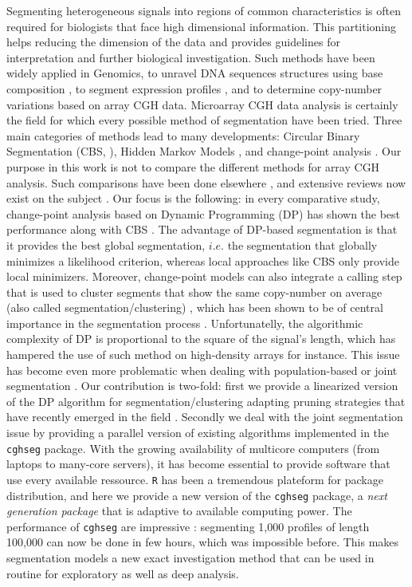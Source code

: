 \documentclass[11pt]{llncs}
\begin{document}
Segmenting heterogeneous signals into regions of common characteristics is often required for biologists that face high dimensional information. This partitioning helps reducing the dimension of the data and provides guidelines for interpretation and further biological investigation. Such methods have been widely applied in Genomics, to unravel DNA sequences structures using base composition \cite{NBM02}, to segment expression profiles \cite{DHG06,NLR09}, and to determine copy-number variations based on array CGH data. Microarray CGH data analysis is certainly the field for which every possible method of segmentation have been tried. Three main categories of methods lead to many developments: Circular Binary Segmentation (CBS, \cite{OVL04}), Hidden Markov Models \cite{MTT06}, and change-point analysis \cite{picard_statistical_2005,picard_2007}. Our purpose in this work is not to compare the different methods for array CGH analysis. Such comparisons have been done elsewhere \cite{WF05}, and extensive reviews now exist on the subject \cite{S08,WPW11}. Our focus is the following: in every comparative study, change-point analysis based on Dynamic Programming (DP) has shown the best performance along with CBS \cite{bams,WF05}. The advantage of DP-based segmentation is that it provides the best global segmentation, $i.e.$ the segmentation that globally minimizes a likelihood criterion, whereas local approaches like CBS only provide local minimizers. Moreover, change-point models can also integrate a calling step that is used to cluster segments that show the same copy-number on average (also called segmentation/clustering) \cite{picard_2007,WKV07}, which has been shown to be of central importance in the segmentation process \cite{WF05}. Unfortunatelly, the algorithmic complexity of DP is proportional to the square of the signal's length, which has hampered the use of such method on high-density arrays for instance. This issue has become even more problematic when dealing with population-based or joint segmentation \cite{PLH11, TPK11,ZSJ10}. Our contribution is two-fold: first we provide a linearized version of the DP algorithm for segmentation/clustering adapting pruning strategies that have recently emerged in the field \cite{killick_optimal_2011,rigaill_2010}. Secondly we deal with the joint segmentation issue by providing a parallel version of existing algorithms implemented in the \texttt{cghseg} package. With the growing availability of multicore computers (from laptops to many-core servers), it has become essential to provide software that use every available ressource. \texttt{R} has been a tremendous plateform for package distribution, and here we provide a new version of the \texttt{cghseg} package, a \textit{next generation package} that is adaptive to available computing power. The performance of \texttt{cghseg} are impressive : segmenting 1,000 profiles of length 100,000 can now be done in few hours, which was impossible before. This makes segmentation models a new exact investigation method that can be used in routine for exploratory as well as deep analysis.
\end{document}
